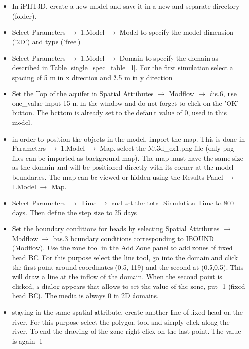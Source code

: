 \begin{itemize}

\item In iPHT3D, create a new model and save it in a new and separate directory (folder).

\item Select Parameters $\rightarrow$ 1.Model $\rightarrow$ Model to specify the model dimension ('2D')
and type ('free')
\item Select Parameters $\rightarrow$ 1.Model $\rightarrow$ Domain to specify
the domain as described in Table \ref{single_spec_table_1}. For the first simulation select a spacing of 5 m in x direction
and 2.5 m in y direction

\item Set the Top of the aquifer in Spatial Attributes $\rightarrow$ Modflow $\rightarrow$ dis.6, 
use one\_value input 15 m in 
the window and do not forget to click on the 'OK' button. 
The bottom is already set to the default value of 0, used in this model.

\item in order to position the objects in the model, import the map. This is done in Parameters $\rightarrow$ 1.Model $\rightarrow$ Map.
select the Mt3d\_ex1.png file (only png files can be imported as background map).
The map must have the same size as the domain and will be positioned directly with its corner at the model boundaries.
The map can be viewed or hidden using the Results Panel $\rightarrow$ 1.Model $\rightarrow$ Map.

\item Select Parameters $\rightarrow$ Time $\rightarrow$ and set the total Simulation Time to 800 days. Then define the step size to 25 days

\item Set the boundary conditions for heads by selecting Spatial Attributes $\rightarrow$ Modflow $\rightarrow$ bas.3 boundary conditions corresponding to
IBOUND (Modflow). Use the zone tool in the Add Zone panel to add zones of fixed head BC. For this purpose select the line tool, go into the domain and click
the first point around coordinates (0.5, 119) and the second at (0.5,0.5). This will draw a line at the inflow of the domain.
When the second point is clicked, a dialog appears that allows to set the value of the zone, put -1 (fixed head BC). The media is always 0 in
2D domains.

\item staying in the same spatial attribute, create another line of fixed head on the river. For this purpose select the polygon tool and simply click 
along the river. To end the drawing of the zone right click on the last point. The value is again -1


\end{itemize}
